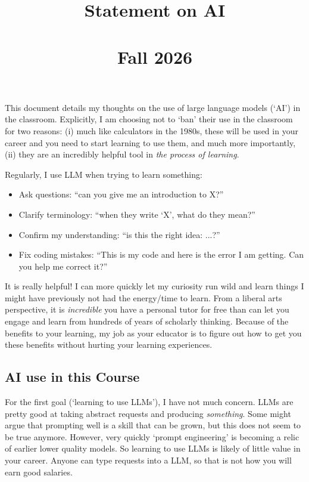 \documentclass[12pt]{article}
\title{
  \vspace{-2em}
	{\huge \ttfamily Statement on AI} \\[-0.75em]
  {\Large \ttfamily [ECON 4753]} \\[-0.5em]
	{\Large Fall 2026}
}
\author{}
\date{}  %
\begin{document}
\maketitle

This document details my thoughts on the use of large language models (`AI') in the classroom. 
Explicitly, I am choosing not to `ban' their use in the classroom for two reasons:
(i) much like calculators in the 1980s, these will be used in your career and you need to start learning to use them, and much more importantly, 
(ii) they are an incredibly helpful tool in \emph{the process of learning}.

Regularly, I use LLM when trying to learn something:
\begin{itemize}
  \item Ask questions: ``can you give me an introduction to X?''
  
  \item Clarify terminology: ``when they write `X', what do they mean?''
  
  \item Confirm my understanding: ``is this the right idea: ...?''
  
  \item Fix coding mistakes: ``This is my code and here is the error I am getting. Can you help me correct it?''
\end{itemize} 

It is really helpful! 
I can more quickly let my curiosity run wild and learn things I might have previously not had the energy/time to learn. 
From a liberal arts perspective, it is \emph{incredible} you have a personal tutor for free than can let you engage and learn from hundreds of years of scholarly thinking.
Because of the benefits to your learning, my job as your educator is to figure out how to get you these benefits without hurting your learning experiences.

\subsection*{AI use in this Course}

For the first goal (`learning to use LLMs'), I have not much concern. 
LLMs are pretty good at taking abstract requests and producing \emph{something}. 
Some might argue that prompting well is a skill that can be grown, but this does not seem to be true anymore.
However, very quickly `prompt engineering' is becoming a relic of earlier lower quality models. 
So learning to use LLMs is likely of little value in your career. 
Anyone can type requests into a LLM, so that is not how you will earn good salaries.
\end{document}
